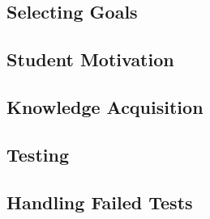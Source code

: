     \subsection{Selecting Goals}
    \subsection{Student Motivation}
    \subsection{Knowledge Acquisition}
    \subsection{Testing}
    \subsection{Handling Failed Tests}
